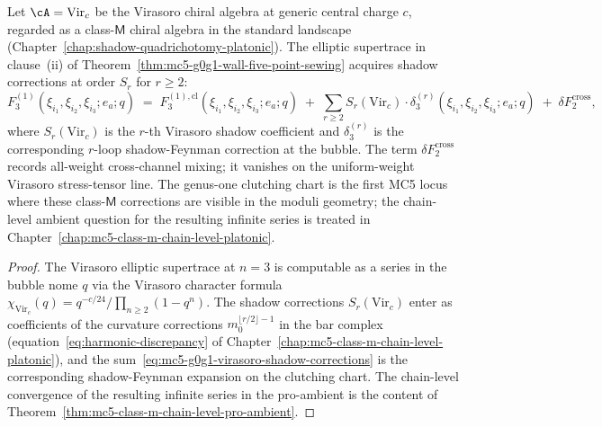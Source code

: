 \begin{corollary}
\label{cor:mc5-g0g1-virasoro-class-m-corrections}
Let $\cA = \mathrm{Vir}_{c}$ be the Virasoro chiral algebra at generic
central charge $c$, regarded as a class-$\mathsf{M}$ chiral algebra in
the standard landscape \textup{(}Chapter~\ref{chap:shadow-quadrichotomy-platonic}\textup{)}.
The elliptic supertrace in clause~\textup{(ii)} of
Theorem~\ref{thm:mc5-g0g1-wall-five-point-sewing} acquires shadow
corrections at order $S_{r}$ for $r \ge 2$:
\begin{equation}
\label{eq:mc5-g0g1-virasoro-shadow-corrections}
F^{(1)}_{3}(\xi_{i_{1}}, \xi_{i_{2}}, \xi_{i_{3}}; e_{a}; q)
\;=\;
F^{(1), \mathrm{cl}}_{3}(\xi_{i_{1}}, \xi_{i_{2}}, \xi_{i_{3}}; e_{a}; q)
\;+\;
\sum_{r \ge 2} S_{r}(\mathrm{Vir}_{c}) \cdot
\delta^{(r)}_{3}(\xi_{i_{1}}, \xi_{i_{2}}, \xi_{i_{3}}; e_{a}; q)
\;+\;\delta F_{2}^{\mathrm{cross}},
\end{equation}
where $S_{r}(\mathrm{Vir}_{c})$ is the $r$-th Virasoro shadow coefficient
and $\delta^{(r)}_{3}$ is the corresponding $r$-loop shadow-Feynman
correction at the bubble. The term $\delta F_{2}^{\mathrm{cross}}$
records all-weight cross-channel mixing; it vanishes on the
uniform-weight Virasoro stress-tensor line. The genus-one clutching
chart is the first MC5 locus where these class-$\mathsf{M}$ corrections
are visible in the moduli geometry; the chain-level ambient question for the
resulting infinite series is treated in
Chapter~\ref{chap:mc5-class-m-chain-level-platonic}.
\end{corollary}

\begin{proof}
The Virasoro elliptic supertrace at $n = 3$ is computable as a series in
the bubble nome $q$ via the Virasoro character formula
$\chi_{\mathrm{Vir}_{c}}(q) = q^{-c/24} / \prod_{n \ge 2} (1 - q^{n})$.
The shadow corrections $S_{r}(\mathrm{Vir}_{c})$ enter as coefficients
of the curvature corrections $m_{0}^{\lfloor r/2 \rfloor - 1}$
in the bar complex
\textup{(}equation~\eqref{eq:harmonic-discrepancy} of
Chapter~\ref{chap:mc5-class-m-chain-level-platonic}\textup{)}, and the
sum~\eqref{eq:mc5-g0g1-virasoro-shadow-corrections} is the corresponding
shadow-Feynman expansion on the clutching chart. The chain-level
convergence of the resulting infinite series in the pro-ambient is the
content of
Theorem~\ref{thm:mc5-class-m-chain-level-pro-ambient}.
\end{proof}

